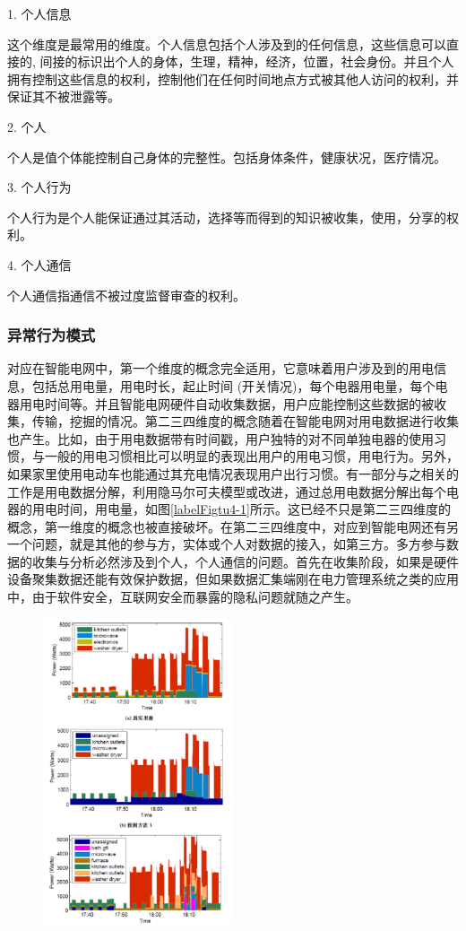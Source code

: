 \documentclass[10.5pt,twocolumn]{jbuaa}
\begin{document}
1. 个人信息

这个维度是最常用的维度。个人信息包括个人涉及到的任何信息，这些信息可以直接的, 间接的标识出个人的身体，生理，精神，经济，位置，社会身份。并且个人拥有控制这些信息的权利，控制他们在任何时间地点方式被其他人访问的权利，并保证其不被泄露等。

2. 个人

个人是值个体能控制自己身体的完整性。包括身体条件，健康状况，医疗情况。

3. 个人行为

个人行为是个人能保证通过其活动，选择等而得到的知识被收集，使用，分享的权利。

4. 个人通信

个人通信指通信不被过度监督审查的权利。

\subsubsection{异常行为模式}
对应在智能电网中，第一个维度的概念完全适用，它意味着用户涉及到的用电信息，包括总用电量，用电时长，起止时间 (开关情况)，每个电器用电量，每个电器用电时间等。并且智能电网硬件自动收集数据，用户应能控制这些数据的被收集，传输，挖掘的情况。第二三四维度的概念随着在智能电网对用电数据进行收集也产生。比如，由于用电数据带有时间戳，用户独特的对不同单独电器的使用习惯，与一般的用电习惯相比可以明显的表现出用户的用电习惯，用电行为。另外，如果家里使用电动车也能通过其充电情况表现用户出行习惯。有一部分与之相关的工作是用电数据分解，利用隐马尔可夫模型或改进，通过总用电数据分解出每个电器的用电时间，用电量，如图\ref{labelFigtu4-1}所示。这已经不只是第二三四维度的概念，第一维度的概念也被直接破坏。在第二三四维度中，对应到智能电网还有另一个问题，就是其他的参与方，实体或个人对数据的接入，如第三方。多方参与数据的收集与分析必然涉及到个人，个人通信的问题。首先在收集阶段，如果是硬件设备聚集数据还能有效保护数据，但如果数据汇集端刚在电力管理系统之类的应用中，由于软件安全，互联网安全而暴露的隐私问题就随之产生。
\begin{figure}[ht]
\centering
\includegraphics [width=0.5\textwidth]{./image/tu4-1.png}
\end{figure}
\end{document}
